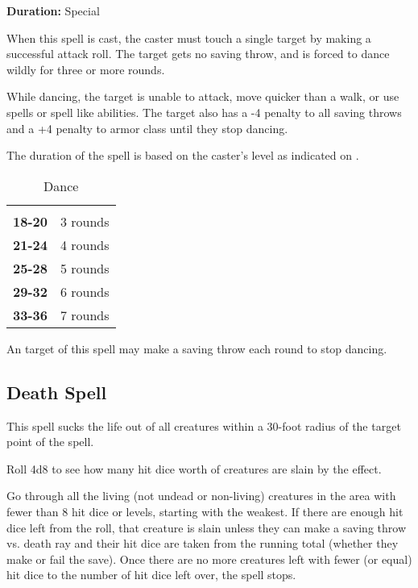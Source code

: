 \begin{multicols*}{2}
{\textbf{Duration:} Special}

When this spell is cast, the caster must touch a single target by making a successful attack roll. The target gets no saving throw, and is forced to dance wildly for three or more rounds.

While dancing, the target is unable to attack, move quicker than a walk, or use spells or spell like abilities. The target also has a -4 penalty to all saving throws and a +4 penalty to armor class until they stop dancing.

The duration of the spell is based on the caster’s level as indicated on .

\begin {table}[H]
	\caption{Dance}\label{tab:Dance}
  \begin{tabularx}{\columnwidth}{>{\bfseries}YY}
	 & \\
	18-20 & 3 rounds\\
	21-24 & 4 rounds\\
	25-28 & 5 rounds\\
	29-32 & 6 rounds\\
	33-36 & 7 rounds
  \end {tabularx}
\end {table}

An  target of this spell may make a saving throw each round to stop dancing.

\subsection{Death Spell}\label{spell:Death Spell}

This spell sucks the life out of all creatures within a 30-foot radius of the target point of the spell.

Roll 4d8 to see how many hit dice worth of creatures are slain by the effect.

Go through all the living (not undead or non-living) creatures in the area with fewer than 8 hit dice or levels, starting with the weakest. If there are enough hit dice left from the roll, that creature is slain unless they can make a saving throw vs. death ray and their hit dice are taken from the running total (whether they make or fail the save). Once there are no more creatures left with fewer (or equal) hit dice to the number of hit dice left over, the spell stops.


\end{multicols*}
